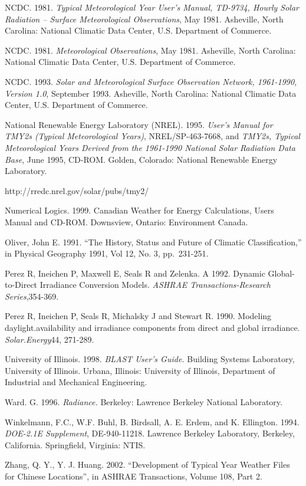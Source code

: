 NCDC. 1981. \emph{Typical Meteorological Year User's Manual, TD-9734, Hourly Solar Radiation -- Surface Meteorological Observations}, May 1981. Asheville, North Carolina: National Climatic Data Center, U.S. Department of Commerce.

NCDC. 1981. \emph{Meteorological Observations}, May 1981. Asheville, North Carolina: National Climatic Data Center, U.S. Department of Commerce.

NCDC. 1993. \emph{Solar and Meteorological Surface Observation Network, 1961-1990, Version 1.0}, September 1993. Asheville, North Carolina: National Climatic Data Center, U.S. Department of Commerce.

National Renewable Energy Laboratory (NREL). 1995. \emph{User's Manual for TMY2s (Typical Meteorological Years)}, NREL/SP-463-7668, and \emph{TMY2s, Typical Meteorological Years Derived from the 1961-1990 National Solar Radiation Data Base}, June 1995, CD-ROM. Golden, Colorado: National Renewable Energy Laboratory.

http://rredc.nrel.gov/solar/pubs/tmy2/

Numerical Logics. 1999. Canadian Weather for Energy Calculations, Users Manual and CD-ROM. Downsview, Ontario: Environment Canada.

Oliver, John E. 1991. ``The History, Status and Future of Climatic Classification,'' in Physical Geography 1991, Vol 12, No. 3, pp.~231-251.

Perez R, Ineichen P, Maxwell E, Seals R and Zelenka. A 1992. Dynamic Global-to-Direct Irradiance Conversion Models. \emph{ASHRAE Transactions-Research Series},354-369.

Perez R, Ineichen P, Seals R, Michalsky J and Stewart R. 1990. Modeling daylight.availability and irradiance components from direct and global irradiance. \emph{Solar.Energy}44, 271-289.

University of Illinois. 1998. \emph{BLAST User's Guide.} Building Systems Laboratory, University of Illinois. Urbana, Illinois: University of Illinois, Department of Industrial and Mechanical Engineering.

Ward. G. 1996. \emph{Radiance.} Berkeley: Lawrence Berkeley National Laboratory.

Winkelmann, F.C., W.F. Buhl, B. Birdsall, A. E. Erdem, and K. Ellington. 1994. \emph{DOE-2.1E Supplement}, DE-940-11218. Lawrence Berkeley Laboratory, Berkeley, California. Springfield, Virginia: NTIS.

Zhang, Q. Y., Y. J. Huang. 2002. ``Development of Typical Year Weather Files for Chinese Locations'', in ASHRAE Transactions, Volume 108, Part 2.
